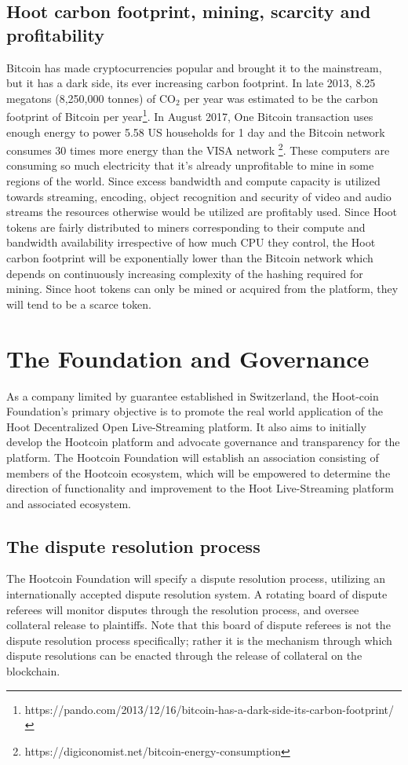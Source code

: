 \documentclass{article}
\begin{document}
\subsection{Hoot carbon footprint, mining, scarcity and profitability}
Bitcoin has made cryptocurrencies popular and brought it to the mainstream, but it has a dark side, its ever increasing carbon footprint. In late 2013, 8.25 megatons (8,250,000 tonnes) of CO$_2$ per year
was estimated to be the carbon footprint of Bitcoin per year\footnote{https://pando.com/2013/12/16/bitcoin-has-a-dark-side-its-carbon-footprint/}. In August 2017, One Bitcoin transaction uses enough energy to power 5.58 US households for 1 day and the  Bitcoin network consumes 30 times more energy than the VISA network \footnote{https://digiconomist.net/bitcoin-energy-consumption}. These
computers are consuming so much electricity that it’s already
unprofitable to mine in some regions of the world. Since excess
bandwidth and compute capacity is utilized towards streaming,
encoding, object recognition
and security of video and audio streams the resources otherwise would
be utilized are profitably used.  Since Hoot tokens are fairly distributed to miners corresponding to their compute and bandwidth availability irrespective of how much CPU they control, the Hoot carbon footprint will be exponentially lower than the Bitcoin network which depends on continuously increasing complexity of the hashing required for mining. Since hoot tokens can only be mined or acquired from the platform, they will tend to be a scarce token.

\section{The Foundation and Governance} %
\label{sec:the_foundation_and_governance}
As a company limited by guarantee established in Switzerland, the Hoot-coin Foundation's primary objective is to promote the real world application of the Hoot Decentralized Open Live-Streaming platform. It also aims to initially develop the Hootcoin platform and advocate governance and transparency for the platform. The Hootcoin Foundation will establish an association consisting of members of the Hootcoin ecosystem, which will be empowered to determine the direction of functionality and improvement to the Hoot Live-Streaming platform and associated ecosystem.

\subsection{The dispute resolution process} %
\label{sub:the_dispute_resolution_process}
The Hootcoin Foundation will specify a dispute resolution process, utilizing an internationally accepted dispute resolution system. A rotating board of dispute referees will monitor disputes through the resolution process, and oversee collateral release to plaintiffs. Note that this board of dispute referees is not the dispute resolution process specifically; rather it is the mechanism through which dispute resolutions can be enacted through the release of collateral on the blockchain.
\end{document}
